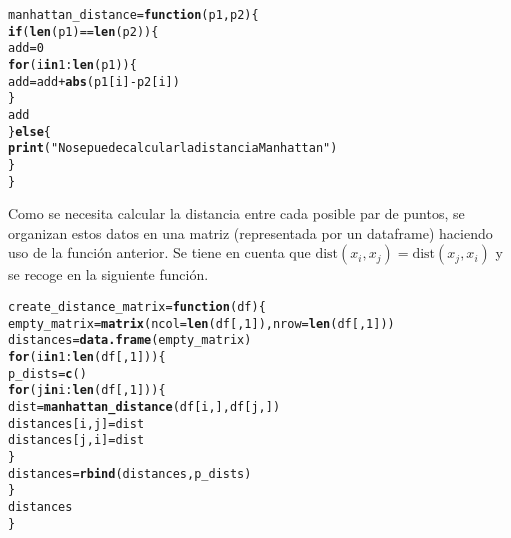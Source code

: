 \documentclass[12pt]{report}\usepackage[]{graphicx}\usepackage[dvipsnames]{xcolor}
\makeatletter
\newcommand{\hlnum}[1]{\textcolor[rgb]{0.686,0.059,0.569}{#1}}%
\newcommand{\hlstr}[1]{\textcolor[rgb]{0.192,0.494,0.8}{#1}}%
\newcommand{\hlopt}[1]{\textcolor[rgb]{0,0,0}{#1}}%
\newcommand{\hlstd}[1]{\textcolor[rgb]{0.345,0.345,0.345}{#1}}%
\newcommand{\hlkwa}[1]{\textcolor[rgb]{0.161,0.373,0.58}{\textbf{#1}}}%
\newcommand{\hlkwb}[1]{\textcolor[rgb]{0.69,0.353,0.396}{#1}}%
\newcommand{\hlkwc}[1]{\textcolor[rgb]{0.333,0.667,0.333}{#1}}%
\newcommand{\hlkwd}[1]{\textcolor[rgb]{0.737,0.353,0.396}{\textbf{#1}}}%
\newenvironment{kframe}{%
 \def\at@end@of@kframe{}%
 \ifinner\ifhmode%
  \def\at@end@of@kframe{\end{minipage}}%
  \begin{minipage}{\columnwidth}%
 \fi\fi%
 \def\FrameCommand##1{\hskip\@totalleftmargin \hskip-\fboxsep
 \colorbox{shadecolor}{##1}\hskip-\fboxsep
     \hskip-\linewidth \hskip-\@totalleftmargin \hskip\columnwidth}%
 \MakeFramed {\advance\hsize-\width
   \@totalleftmargin\z@ \linewidth\hsize
   \@setminipage}}%
 {\par\unskip\endMakeFramed%
 \at@end@of@kframe}
\newenvironment{knitrout}{}{} %
\newcommand{\dt}{\text{dist}}
\makeatother
\begin{document}
\begin{knitrout}
\color{fgcolor}\begin{kframe}
\begin{alltt}
\hlstd{manhattan_distance} \hlkwb{=} \hlkwa{function}\hlstd{(}\hlkwc{p1}\hlstd{,} \hlkwc{p2}\hlstd{) \{}
        \hlkwa{if}\hlstd{(}\hlkwd{len}\hlstd{(p1)} \hlopt{==} \hlkwd{len}\hlstd{(p2))\{}
                \hlstd{add} \hlkwb{=} \hlnum{0}
                \hlkwa{for}\hlstd{(i} \hlkwa{in} \hlnum{1}\hlopt{:}\hlkwd{len}\hlstd{(p1)) \{}
                        \hlstd{add} \hlkwb{=} \hlstd{add} \hlopt{+} \hlkwd{abs}\hlstd{(p1[i]} \hlopt{-} \hlstd{p2[i])}
                \hlstd{\}}
                \hlstd{add}
        \hlstd{\}} \hlkwa{else} \hlstd{\{}
                \hlkwd{print}\hlstd{(}\hlstr{"No se puede calcular la distancia Manhattan"}\hlstd{)}
        \hlstd{\}}
\hlstd{\}}
\end{alltt}
\end{kframe}
\end{knitrout}
						
						Como se necesita calcular la distancia entre cada posible par de puntos, se organizan estos datos en una matriz (representada por un dataframe) haciendo uso de la función anterior. Se tiene en cuenta que $\dt(x_i, x_j) = \dt(x_j, x_i)$ y se recoge en la siguiente función. 
						
\begin{knitrout}
\color{fgcolor}\begin{kframe}
\begin{alltt}
\hlstd{create_distance_matrix} \hlkwb{=} \hlkwa{function}\hlstd{(}\hlkwc{df}\hlstd{) \{}
        \hlstd{empty_matrix} \hlkwb{=} \hlkwd{matrix}\hlstd{(}\hlkwc{ncol} \hlstd{=} \hlkwd{len}\hlstd{(df[,}\hlnum{1}\hlstd{]),} \hlkwc{nrow} \hlstd{=} \hlkwd{len}\hlstd{(df[,}\hlnum{1}\hlstd{]))}
        \hlstd{distances} \hlkwb{=} \hlkwd{data.frame}\hlstd{(empty_matrix)}
        \hlkwa{for} \hlstd{(i} \hlkwa{in} \hlnum{1}\hlopt{:}\hlkwd{len}\hlstd{(df[,}\hlnum{1}\hlstd{])) \{}
                \hlstd{p_dists} \hlkwb{=} \hlkwd{c}\hlstd{()}
                \hlkwa{for} \hlstd{(j} \hlkwa{in} \hlstd{i}\hlopt{:}\hlkwd{len}\hlstd{(df[,}\hlnum{1}\hlstd{])) \{}
                        \hlstd{dist} \hlkwb{=} \hlkwd{manhattan_distance}\hlstd{(df[i,], df[j,])}
                        \hlstd{distances[i,j]} \hlkwb{=} \hlstd{dist}
                        \hlstd{distances[j,i]} \hlkwb{=} \hlstd{dist}
                \hlstd{\}}
                \hlstd{distances} \hlkwb{=} \hlkwd{rbind}\hlstd{(distances, p_dists)}
        \hlstd{\}}
        \hlstd{distances}
\hlstd{\}}
\end{alltt}
\end{kframe}
\end{knitrout}
						
\end{document}
